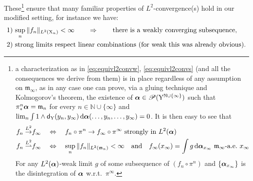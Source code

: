 \documentclass[11pt]{article}
\numberwithin{equation}{section}
\newcommand{\N}{\mathbb{N}}
\newcommand{\aalpha}{{\mbox{\boldmath$\alpha$}}}
\newcommand{\pr}{\mathscr P}
\newcommand{\X}{{\rm X}}
\newcommand{\Y}{{\rm Y}}
\newcommand{\sfd}{{\sf d}}
\newcommand{\mm}{{\mathfrak m}}
\renewcommand{\d}{{\rm d}}
\newcommand{\weakto}{\rightharpoonup}
\begin{document}
These\footnote{a characterization as in \eqref{eq:equivl2convw}, \eqref{eq:equivl2convs} (and all the consequences we derive from them) is in place regardless of any assumption on $\mm_\infty$, as in any case one can prove, via a gluing technique and Kolmogorov's theorem, the existence of $\aalpha\in\pr(\Y^{ \N\cup\{\infty\}})$ such that $\pi^n_*\aalpha=\mm_n$ for every $n\in\N\cup\{\infty\}$ and $\lim_n\int1\wedge\sfd_\Y(y_n,y_\infty)\,\d\aalpha(\ldots,y_n,\ldots,y_\infty)=0$. It is then easy to see that
\begin{subequations}
\begin{align}
\label{eq:strongequiv}
f_n\stackrel{L^2}\to& f_\infty\quad\Leftrightarrow \quad f_n\circ\pi^n\to f_\infty\circ\pi^\infty\text{ strongly in }L^2(\aalpha) \\
\label{eq:weakequiv}
f_n\stackrel{L^2}\weakto &f_\infty\quad\Leftrightarrow\quad \sup_n\|f_n\|_{L^2(\mm_n)}<\infty\quad\text{and}\quad f_\infty (x_\infty)=\int g\,\d\aalpha_{x_\infty} \ \mm_\infty\text{-a.e.}\ x_\infty
\end{align}
\end{subequations}
For any $L^2(\aalpha)$-weak limit  $g$ of some subsequence of $(f_n\circ\pi^n)$ and $\{\aalpha_{x_\infty}\}$ is the disintegration of $\aalpha$ w.r.t.\ $\pi^\infty$. 
}
 ensure that many familiar properties of $L^2$-convergence(s) hold in our modified setting, for instance we have:
\begin{equation}
\label{eq:exprl2}
\begin{split}
&\text{1) $\sup_n\|f_n\|_{L^2(\X_n)}<\infty\qquad\Rightarrow\qquad$ there is a weakly converging subsequence},\\
&\text{2) strong limits respect linear  combinations (for weak this was already obvious)}.
\end{split}
\end{equation}
\end{document}
